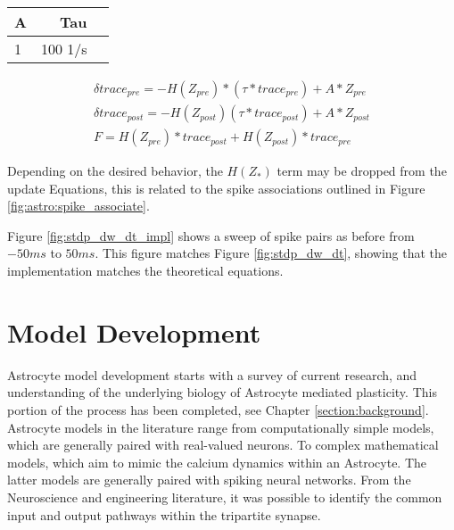 \begin{table}[!htp]\centering
  \label{table:classic_stdp_params}
  \scriptsize
  \begin{tabular}{lrr}\toprule
    A &Tau \\\midrule
    1 &100 1/s \\
    \bottomrule
  \end{tabular}
\end{table}


\begin{align}
  \delta trace_{pre} = -H(Z_{pre})*(\tau * trace_{pre}) +
  A*Z_{pre} \label{eq:song_impl_pre} \\ 
  \delta trace_{post} = -H(Z_{post})(\tau * trace_{post}) +
  A*Z_{post} \label{eq:song_impl_post} \\
  F = H(Z_{pre}) * trace_{post} + H(Z_{post}) *
  trace_{pre} \label{eq:song_impl_dw}
\end{align}

Depending on the desired behavior, the $H(Z_*)$ term may be dropped from the
update Equations, this is related to the spike associations outlined in Figure
\ref{fig:astro:spike_associate}.

Figure \ref{fig:stdp_dw_dt_impl} shows a sweep of spike pairs as before from
$-50ms$ to $50ms$. This figure matches Figure \ref{fig:stdp_dw_dt}, showing that
the implementation matches the theoretical equations.




\section{Model Development}
Astrocyte model development starts with a survey of current research, and
understanding of the underlying biology of Astrocyte mediated plasticity. This
portion of the process has been completed, see Chapter
\ref{section:background}. Astrocyte models in the literature range from
computationally simple models, which are generally paired with real-valued
neurons. To complex mathematical models, which aim to mimic the calcium dynamics
within an Astrocyte. The latter models are generally paired with spiking neural
networks. From the Neuroscience and engineering literature, it was possible to
identify the common input and output pathways within the tripartite synapse.

